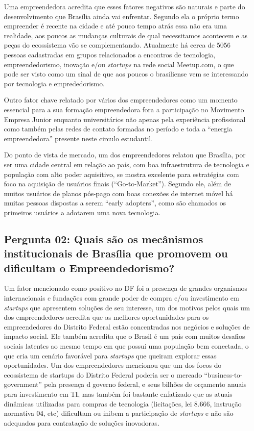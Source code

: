 Uma empreendedora acredita que esses fatores negativos são naturais e parte do desenvolvimento que Brasília ainda vai enfrentar. Segundo ela o próprio termo empreender é recente na cidade e até pouco tempo atrás essa não era uma realidade, aos poucos as mudanças culturais de qual necessitamos acontecem e as peças do ecossistema vão se complementando. Atualmente há cerca de 5056 pessoas cadastradas em grupos relacionados a encontros de tecnologia, empreendedorismo, inovação e/ou \textit{startups} na rede social Meetup.com, o que pode ser visto como um sinal de que aos poucos o brasiliense vem se interessando por tecnologia e emprededorismo.

Outro fator chave relatado por vários dos empreendedores como um momento essencial para a sua formação empreendedora fora a participação no Movimento Empresa Junior enquanto universitários não apenas pela experiência profissional como também pelas redes de contato formadas no período e toda a ``energia empreendedora'' presente neste circulo estudantil. 

Do ponto de vista de mercado, um dos empreendedores relatou que Brasília, por ser uma cidade central em relação ao país, com boa infraestrutura de tecnologia e população com alto poder aquisitivo, se mostra excelente para estratégias com foco na aquisição de usuários finais (``Go-to-Market''). Segundo ele, além de muitos usuários de planos pós-pago com boas conexões de internet móvel há muitas pessoas dispostas a serem ``early adopters'', como são chamados os primeiros usuários a adotarem uma nova tecnologia.

\subsection*{Pergunta 02: Quais são os mecânismos institucionais de Brasília que promovem ou dificultam o Empreendedorismo?}
\label{subsection:pergunta_de_pesquisa_2}

Um fator mencionado como positivo no DF foi a presença de grandes organismos internacionais e fundações com grande poder de compra e/ou investimento em \textit{startups} que apresentem soluções de seu interesse, um dos motivos pelos quais um dos empreendedores acredita que as melhores oportunidades para os empreendedores do Distrito Federal estão concentradas nos negócios e soluções de impacto social. Ele também acredita que o Brasil é um país com muitos desafios sociais latentes ao mesmo tempo em que possui uma população bem conectada, o que cria um cenário favorável para \textit{startups} que queiram explorar essas oportunidades. Um dos empreendedores mencionou que um dos focos do ecossistema de startups do Distrito Federal poderia ser o mercado ``business-to-government'' pela presença d governo federal, e seus bilhões de orçamento anuais para investimento em TI, mas também foi bastante enfatizado que as atuais dinâmicas utilizadas para compras de tecnologia (licitações, lei 8.666, instrução normativa 04, etc) dificultam ou inibem a participação de \textit{startups} e não são adequados para contratação de soluções inovadoras. 


